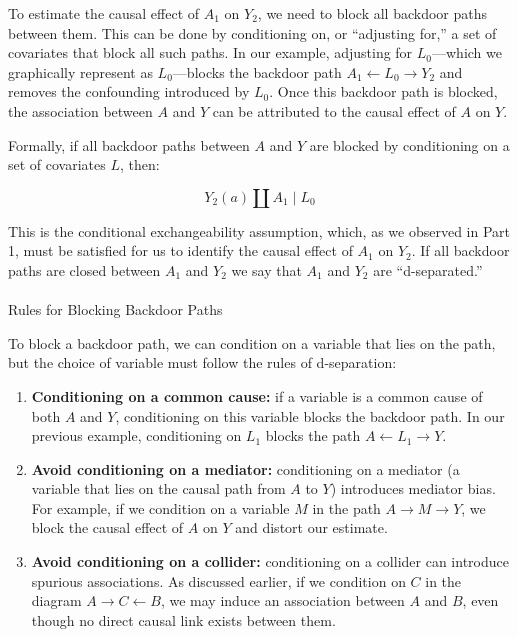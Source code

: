 \documentclass[
  singlecolumn]{article}
\makeatletter
\let\oldparagraph\paragraph
\renewcommand{\paragraph}{
    \@ifstar
      \xxxParagraphStar
      \xxxParagraphNoStar
  }
\newcommand{\xxxParagraphStar}[1]{\oldparagraph*{#1}\mbox{}}
\newcommand{\xxxParagraphNoStar}[1]{\oldparagraph{#1}\mbox{}}
\makeatother
\begin{document}
To estimate the causal effect of \(A_1\) on \(Y_2\), we need to block
all backdoor paths between them. This can be done by conditioning on, or
``adjusting for,'' a set of covariates that block all such paths. In our
example, adjusting for \(L_0\)---which we graphically represent as
\(\boxed{L_0}\)---blocks the backdoor path
\(A_1 \leftarrow \boxed{L_0} \rightarrow Y_2\) and removes the
confounding introduced by \(L_0\). Once this backdoor path is blocked,
the association between \(A\) and \(Y\) can be attributed to the causal
effect of \(A\) on \(Y\).

Formally, if all backdoor paths between \(A\) and \(Y\) are blocked by
conditioning on a set of covariates \(L\), then:

\[
Y_2(a) \coprod A_1 \mid L_0
\]

This is the conditional exchangeability assumption, which, as we
observed in Part 1, must be satisfied for us to identify the causal
effect of \(A_1\) on \(Y_2\). If all backdoor paths are closed between
\(A_1\) and \(Y_2\) we say that \(A_1\) and \(Y_2\) are ``d-separated.''

\paragraph{Rules for Blocking Backdoor
Paths}\label{rules-for-blocking-backdoor-paths}

To block a backdoor path, we can condition on a variable that lies on
the path, but the choice of variable must follow the rules of
d-separation:

\begin{enumerate}
\def\labelenumi{\arabic{enumi}.}
\item
  \textbf{Conditioning on a common cause:} if a variable is a common
  cause of both \(A\) and \(Y\), conditioning on this variable blocks
  the backdoor path. In our previous example, conditioning on \(L_1\)
  blocks the path \(A \leftarrow L_1 \rightarrow Y\).
\item
  \textbf{Avoid conditioning on a mediator:} conditioning on a mediator
  (a variable that lies on the causal path from \(A\) to \(Y\))
  introduces mediator bias. For example, if we condition on a variable
  \(M\) in the path \(A \rightarrow M \rightarrow Y\), we block the
  causal effect of \(A\) on \(Y\) and distort our estimate.
\item
  \textbf{Avoid conditioning on a collider:} conditioning on a collider
  can introduce spurious associations. As discussed earlier, if we
  condition on \(C\) in the diagram \(A \rightarrow C \leftarrow B\), we
  may induce an association between \(A\) and \(B\), even though no
  direct causal link exists between them.
\end{enumerate}
\end{document}
